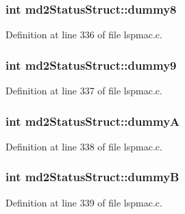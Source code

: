 \hypertarget{structmd2StatusStruct_a17f44367cfa4c66ec3ee481863ef4960}{
\subsubsection[{dummy8}]{\setlength{\rightskip}{0pt plus 5cm}int md2\-Status\-Struct\-::dummy8}}\label{structmd2StatusStruct_a17f44367cfa4c66ec3ee481863ef4960}


Definition at line 336 of file lspmac.\-c.

\hypertarget{structmd2StatusStruct_aa5aadda5a5cb98c6028f8b45e16cd084}{
\subsubsection[{dummy9}]{\setlength{\rightskip}{0pt plus 5cm}int md2\-Status\-Struct\-::dummy9}}\label{structmd2StatusStruct_aa5aadda5a5cb98c6028f8b45e16cd084}


Definition at line 337 of file lspmac.\-c.

\hypertarget{structmd2StatusStruct_a9fc7dc802d00c22463dd7ddd531e06d7}{
\subsubsection[{dummy\-A}]{\setlength{\rightskip}{0pt plus 5cm}int md2\-Status\-Struct\-::dummy\-A}}\label{structmd2StatusStruct_a9fc7dc802d00c22463dd7ddd531e06d7}


Definition at line 338 of file lspmac.\-c.

\hypertarget{structmd2StatusStruct_aab597be69a8dcc140778d9aeb8a50eee}{
\subsubsection[{dummy\-B}]{\setlength{\rightskip}{0pt plus 5cm}int md2\-Status\-Struct\-::dummy\-B}}\label{structmd2StatusStruct_aab597be69a8dcc140778d9aeb8a50eee}


Definition at line 339 of file lspmac.\-c.

